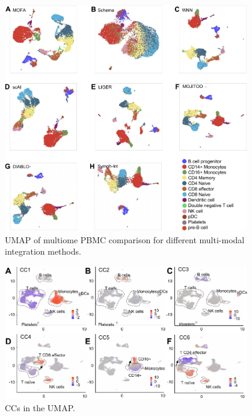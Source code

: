 \begin{figure}[!ht]
	\centering
	\includegraphics[width=0.95\textwidth]{pbmc_multiome_umap/fig}
	\vspace{0.1cm}
	\caption[UMAP of multiome PBMC comparison for different multi-modal integration methods.]{UMAP of multiome PBMC comparison for different multi-modal integration methods.}
	\label{fig:pbmc_multiome_umap}
\end{figure}


\begin{figure}[!ht]
	\centering
	\includegraphics[width=0.95\textwidth]{CC_UMAP/fig}
	\vspace{0.1cm}
	\caption[CCs in the UMAP.]{CCs in the UMAP.}
	\label{fig:CC_UMAP}
\end{figure}





